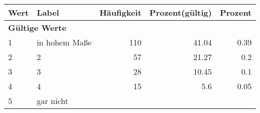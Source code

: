      \begin{longtable}{lXrrr}
     \toprule
     \textbf{Wert} & \textbf{Label} & \textbf{Häufigkeit} & \textbf{Prozent(gültig)} & \textbf{Prozent} \\
     \endhead
     \midrule
     \multicolumn{5}{l}{\textbf{Gültige Werte}}\\

     1 &
     \multicolumn{1}{X}{ in hohem Maße   } &


       \num{110} &
       \num[round-mode=places,round-precision=2]{41,04} &
         \num[round-mode=places,round-precision=2]{0,39} \\

     2 &
     \multicolumn{1}{X}{ 2   } &


       \num{57} &
       \num[round-mode=places,round-precision=2]{21,27} &
         \num[round-mode=places,round-precision=2]{0,2} \\

     3 &
     \multicolumn{1}{X}{ 3   } &


       \num{28} &
       \num[round-mode=places,round-precision=2]{10,45} &
         \num[round-mode=places,round-precision=2]{0,1} \\

     4 &
     \multicolumn{1}{X}{ 4   } &


       \num{15} &
       \num[round-mode=places,round-precision=2]{5,6} &
         \num[round-mode=places,round-precision=2]{0,05} \\

     5 &
     \multicolumn{1}{X}{ gar nicht   } &



\end{longtable}
